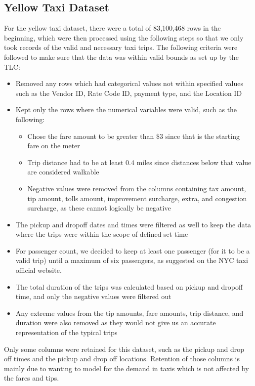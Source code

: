 \documentclass[11pt]{article}
\begin{document}
\subsection{Yellow Taxi Dataset}
For the yellow taxi dataset, there were a total of 83,100,468 rows in the beginning, which were then processed using the following steps so that we only took records of the valid and necessary taxi trips.
The following criteria were followed to make sure that the data was within valid bounds as set up by the TLC\cite{nyctaxidatadictionary}:
\begin{itemize}
    \item Removed any rows which had categorical values not within specified values such as the Vendor ID, Rate Code ID, payment type, and the Location ID
    \item Kept only the rows where the numerical variables were valid, such as the following:
    \begin{itemize}
        \item Chose the fare amount to be greater than \$3 since that is the starting fare on the meter\cite{nyctaxifares}
        \item Trip distance had to be at least 0.4 miles since distances below that value are considered walkable
        \item Negative values were removed from the columns containing tax amount, tip amount, tolls amount, improvement surcharge, extra, and congestion surcharge, as these cannot logically be negative
    \end{itemize}
    \item The pickup and dropoff dates and times were filtered as well to keep the data where the trips were within the scope of defined set time
    \item For passenger count, we decided to keep at least one passenger (for it to be a valid trip) until a maximum of six passengers, as suggested on the NYC taxi official website.\cite{nyctaxifares}
    \item The total duration of the trips was calculated based on pickup and dropoff time, and only the negative values were filtered out
    \item Any extreme values from the tip amounts, fare amounts, trip distance, and duration were also removed as they would not give us an accurate representation of the typical trips
\end{itemize}

Only some columns were retained for this dataset, such as the pickup and drop off times and the pickup and drop off locations. Retention of those columns is mainly due to wanting to model for the demand in taxis which is not affected by the fares and tips. 
\end{document}
